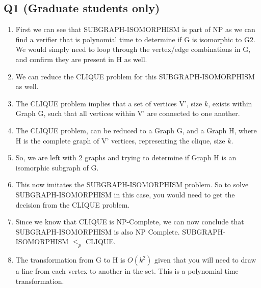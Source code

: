 \documentclass{article}
\begin{document}
\subsection*{Q1 (Graduate students only)}
\begin{enumerate}[label=(\alph*)]
    \item First we can see that SUBGRAPH-ISOMORPHISM is part of NP as we can find a verifier that is polynomial time to determine if G is isomorphic to G2. We would simply need to loop through the vertex/edge combinations in G, and confirm they are present in H as well.
    \item We can reduce the CLIQUE problem for this SUBGRAPH-ISOMORPHISM as well.
    \item The CLIQUE problem implies that a set of vertices V', size $k$, exists within Graph G, such that all vertices within V' are connected to one another. 
    \item The CLIQUE problem, can be reduced to a Graph G, and a Graph H, where H is the complete graph of V' vertices, representing the clique, size $k$.
    \item So, we are left with 2 graphs and trying to determine if Graph H is an isomorphic subgraph of G.
    \item This now imitates the SUBGRAPH-ISOMORPHISM problem. So to solve SUBGRAPH-ISOMORPHISM in this case, you would need to get the decision from the CLIQUE problem.
    \item Since we know that CLIQUE is NP-Complete, we can now conclude that SUBGRAPH-ISOMORPHISM is also NP Complete. SUBGRAPH-ISOMORPHISM $\leq_p$ CLIQUE.
    \item The transformation from G to H is $O(k^2)$ given that you will need to draw a line from each vertex to another in the set. This is a polynomial time transformation.
\end{enumerate}
\end{document}
